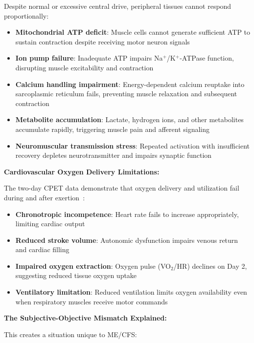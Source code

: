 Despite normal or excessive central drive, peripheral tissues cannot respond proportionally:

\begin{itemize}
    \item \textbf{Mitochondrial ATP deficit}: Muscle cells cannot generate sufficient ATP to sustain contraction despite receiving motor neuron signals
    \item \textbf{Ion pump failure}: Inadequate ATP impairs Na$^+$/K$^+$-ATPase function, disrupting muscle excitability and contraction
    \item \textbf{Calcium handling impairment}: Energy-dependent calcium reuptake into sarcoplasmic reticulum fails, preventing muscle relaxation and subsequent contraction
    \item \textbf{Metabolite accumulation}: Lactate, hydrogen ions, and other metabolites accumulate rapidly, triggering muscle pain and afferent signaling
    \item \textbf{Neuromuscular transmission stress}: Repeated activation with insufficient recovery depletes neurotransmitter and impairs synaptic function
\end{itemize}

\textbf{Cardiovascular Oxygen Delivery Limitations:}

The two-day CPET data demonstrate that oxygen delivery and utilization fail during and after exertion~\cite{keller2024cpet}:

\begin{itemize}
    \item \textbf{Chronotropic incompetence}: Heart rate fails to increase appropriately, limiting cardiac output
    \item \textbf{Reduced stroke volume}: Autonomic dysfunction impairs venous return and cardiac filling
    \item \textbf{Impaired oxygen extraction}: Oxygen pulse (VO$_2$/HR) declines on Day 2, suggesting reduced tissue oxygen uptake
    \item \textbf{Ventilatory limitation}: Reduced ventilation limits oxygen availability even when respiratory muscles receive motor commands
\end{itemize}

\textbf{The Subjective-Objective Mismatch Explained:}

This creates a situation unique to ME/CFS:

